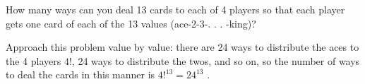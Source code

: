 \question How many ways can you deal 13 cards to each of 4 players 
so that each player gets one card of each of the 13 values 
(ace-2-3-. . . -king)? 
\begin{solution}[2 cm]
Approach this problem value by value: there are 24 ways to distribute 
the aces to the 4 players $4!$, 24 ways to distribute the twos, and so 
on, so the number of ways to deal the cards in this manner is 
$4!^{13} = 24^{13}$ .
\end{solution}
